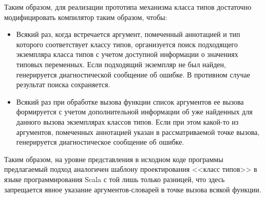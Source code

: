 Таким образом, для реализации прототипа механизма класса типов достаточно модифицировать компилятор таким образом, чтобы:
\begin{itemize}
    \item Всякий раз, когда встречается аргумент, помеченный аннотацией  и тип которого соответствует классу типов, организуется поиск подходящего экземпляра класса типов с учетом доступной информации о значениях типовых переменных. Если подходящий экземпляр не был найден, генерируется диагностической сообщение об ошибке. В противном случае результат поиска сохраняется.
    \item Всякий раз при обработке вызова функции список аргументов ее вызова формируется с учетом дополнительной информации об уже найденных для данного вызова экземплярах классов типов. Если при этом какой-то из аргументов, помеченных аннотацией  указан в рассматриваемой точке вызова, генерируется диагностическое сообщение об ошибке.
\end{itemize}
Таким образом, на уровне представления в исходном коде программы предлагаемый подход аналогичен шаблону проектирования <<класс типов>> в языке программирования Scala с той лишь только разницей, что здесь запрещается явное указание аргументов-словарей в точке вызова всякой функции. %

